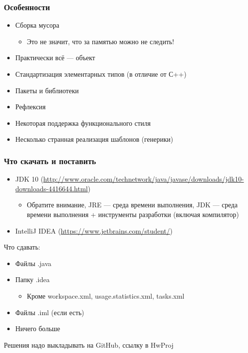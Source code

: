 \documentclass[xetex,mathserif,serif]{beamer}
\begin{document}
	\begin{frame}
		\frametitle{Особенности}
		\begin{itemize}
			\item Сборка мусора
			\begin{itemize}
				\item Это не значит, что за памятью можно не следить!
			\end{itemize}
			\item Практически всё --- объект
			\item Стандартизация элементарных типов (в отличие от С++)
			\item Пакеты и библиотеки
			\item Рефлексия
			\item Некоторая поддержка функционального стиля
			\item Несколько странная реализация шаблонов (генерики)
		\end{itemize}
	\end{frame}

	\begin{frame}
		\frametitle{Что скачать и поставить}
		\begin{itemize}
			\item JDK 10 (\url{http://www.oracle.com/technetwork/java/javase/downloads/jdk10-downloads-4416644.html})
			\begin{itemize}
				\item Обратите внимание, JRE --- среда времени выполнения, JDK --- среда времени выполнения + инструменты разработки (включая компилятор)
			\end{itemize}
			\item IntelliJ IDEA (\url{https://www.jetbrains.com/student/})
		\end{itemize}
		Что сдавать:
		\begin{itemize}
			\item Файлы .java
			\item Папку .idea
			\begin{itemize}
				\item Кроме workspace.xml, usage.statistics.xml, tasks.xml
			\end{itemize}
			\item Файлы .iml (если есть)
			\item Ничего больше
		\end{itemize}
		Решения надо выкладывать на GitHub, ссылку в HwProj
	\end{frame}
\end{document}
